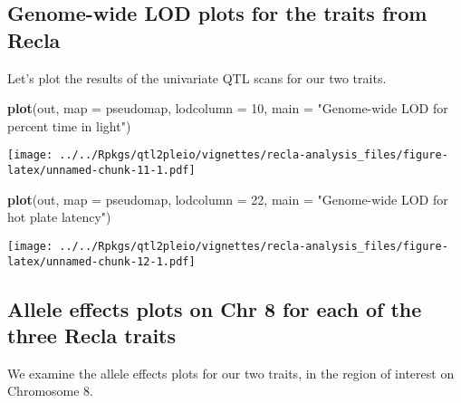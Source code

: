 \documentclass{book}
\newenvironment{Shaded}{\begin{snugshade}}{\end{snugshade}}
\newcommand{\DataTypeTok}[1]{\textcolor[rgb]{0.13,0.29,0.53}{#1}}
\newcommand{\DecValTok}[1]{\textcolor[rgb]{0.00,0.00,0.81}{#1}}
\newcommand{\KeywordTok}[1]{\textcolor[rgb]{0.13,0.29,0.53}{\textbf{#1}}}
\newcommand{\NormalTok}[1]{#1}
\newcommand{\StringTok}[1]{\textcolor[rgb]{0.31,0.60,0.02}{#1}}
\begin{document}
\hypertarget{genome-wide-lod-plots-for-the-traits-from-recla}{%
\subsection{Genome-wide LOD plots for the traits from
Recla}\label{genome-wide-lod-plots-for-the-traits-from-recla}}

Let's plot the results of the univariate QTL scans for our two traits.

\begin{Shaded}
\begin{Highlighting}[]
\KeywordTok{plot}\NormalTok{(out, }\DataTypeTok{map =}\NormalTok{ pseudomap, }\DataTypeTok{lodcolumn =} \DecValTok{10}\NormalTok{, }\DataTypeTok{main =} \StringTok{"Genome-wide LOD for percent time in light"}\NormalTok{)}
\end{Highlighting}
\end{Shaded}

\texttt{[image: ../../Rpkgs/qtl2pleio/vignettes/recla-analysis\_files/figure-latex/unnamed-chunk-11-1.pdf]}

\begin{Shaded}
\begin{Highlighting}[]
\KeywordTok{plot}\NormalTok{(out, }\DataTypeTok{map =}\NormalTok{ pseudomap, }\DataTypeTok{lodcolumn =} \DecValTok{22}\NormalTok{, }\DataTypeTok{main =} \StringTok{"Genome-wide LOD for hot plate latency"}\NormalTok{)}
\end{Highlighting}
\end{Shaded}

\texttt{[image: ../../Rpkgs/qtl2pleio/vignettes/recla-analysis\_files/figure-latex/unnamed-chunk-12-1.pdf]}

\hypertarget{allele-effects-plots-on-chr-8-for-each-of-the-three-recla-traits}{%
\subsection{Allele effects plots on Chr 8 for each of the three Recla
traits}\label{allele-effects-plots-on-chr-8-for-each-of-the-three-recla-traits}}

We examine the allele effects plots for our two traits, in the region of
interest on Chromosome 8.
\end{document}

